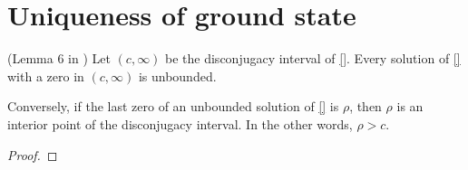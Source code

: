 \newpage \section{Uniqueness of ground state}











\newpage
\begin{lemma}\label{kwong6} (Lemma 6 in \cite{kwong}) Let $(c,\infty)$ be the disconjugacy interval of \eqref{}. Every solution of \eqref{} with a zero in $(c,\infty)$ is unbounded.

Conversely, if the last zero of an unbounded solution of \eqref{} is $\rho$, then $\rho$ is an interior point of the disconjugacy interval. In the other words, $\rho>c$.
\begin{proof} \end{proof}
\end{lemma}